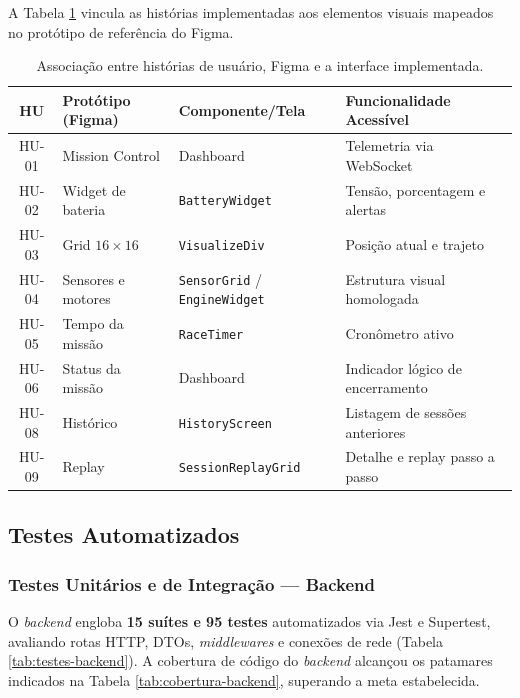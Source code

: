 A Tabela \ref{tab:hu-prototipo} vincula as histórias implementadas aos elementos visuais mapeados no protótipo de referência do Figma.

\begin{table}[H]
\centering
\small
\renewcommand{\arraystretch}{1.2}
\caption{Associação entre histórias de usuário, Figma e a interface implementada.}
\label{tab:hu-prototipo}
\begin{tabularx}{\linewidth}{|c|l|l|X|}
\hline
\textbf{HU} & \textbf{Protótipo (Figma)} & \textbf{Componente/Tela} & \textbf{Funcionalidade Acessível} \\ \hline
HU-01 & Mission Control & Dashboard & Telemetria via WebSocket \\ \hline
HU-02 & Widget de bateria & \texttt{BatteryWidget} & Tensão, porcentagem e alertas \\ \hline
HU-03 & Grid $16 \times 16$ & \texttt{VisualizeDiv} & Posição atual e trajeto \\ \hline
HU-04 & Sensores e motores & \texttt{SensorGrid} / \texttt{EngineWidget} & Estrutura visual homologada \\ \hline
HU-05 & Tempo da missão & \texttt{RaceTimer} & Cronômetro ativo \\ \hline
HU-06 & Status da missão & Dashboard & Indicador lógico de encerramento \\ \hline
HU-08 & Histórico & \texttt{HistoryScreen} & Listagem de sessões anteriores \\ \hline
HU-09 & Replay & \texttt{SessionReplayGrid} & Detalhe e replay passo a passo \\ \hline
\end{tabularx}
\end{table}

\subsection{Testes Automatizados}

\subsubsection{Testes Unitários e de Integração — Backend}
O \textit{backend} engloba \textbf{15 suítes e 95 testes} automatizados via Jest e Supertest, avaliando rotas HTTP, DTOs, \textit{middlewares} e conexões de rede (Tabela \ref{tab:testes-backend}). A cobertura de código do \textit{backend} alcançou os patamares indicados na Tabela \ref{tab:cobertura-backend}, superando a meta estabelecida.

